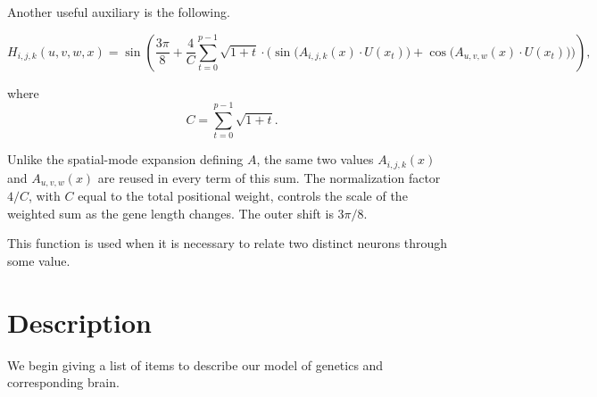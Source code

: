 \documentclass[12pt,a4paper]{article}
\begin{document}
	Another useful auxiliary is the following.
	
	\begin{equation}
		H_{i,j,k}(u, v, w, x) = \sin\left( \frac{3\pi}{8} + \frac{4}{C} \sum_{t=0}^{p-1} \sqrt{1 + t} \cdot \Big( \sin \big( A_{i, j, k}(x) \cdot U(x_t) \big) + \cos \big( A_{u, v, w}(x) \cdot U(x_t) \big) \Big) \right) ,
	\label{H}
	\end{equation}
	
where $$C = \sum_{t=0}^{p-1} \sqrt{1 + t}.$$ 
			
	
	Unlike the spatial-mode expansion defining $A$, the same two values $A_{i,j,k}(x)$ and $A_{u,v,w}(x)$ are reused in every term of this sum. The normalization factor $4/C$, with $C$ equal to the total positional weight, controls the scale of the weighted sum as the gene length changes. The outer shift is $3\pi/8$. 
	
	This function is used when it is necessary to relate two distinct neurons through some value.
	
\section{Description}

We begin giving a list of items to describe our model of genetics and corresponding brain.
\end{document}
